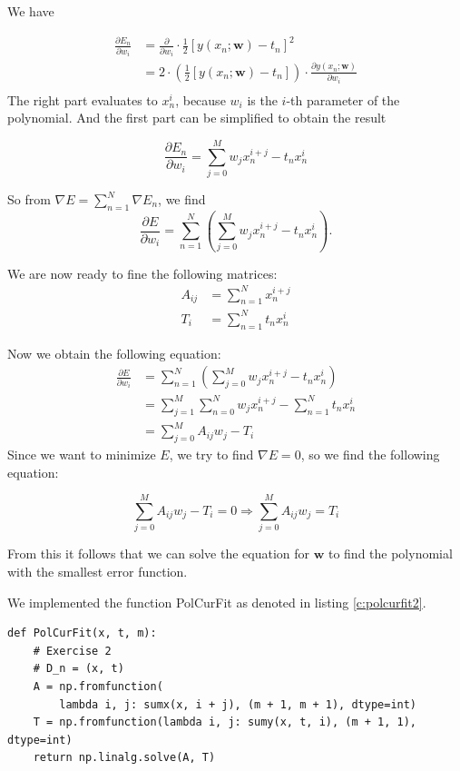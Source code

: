 \documentclass[11pt]{article}
\begin{document}
We have 

\begin{align*}
\frac{\partial E_n}{\partial w_i} &= \frac{\partial }{\partial w_i} \cdot \frac{1}{2} \left[y(x_n;\textbf{w})-t_n\right]^2 \\
&= 2\cdot \left( \frac{1}{2} \left[y(x_n;\textbf{w})-t_n\right] \right) \cdot \frac{\partial  y(x_n;\textbf{w})}{\partial w_i} \\
\end{align*}
The right part evaluates to $x_n^i$, because $w_i$ is the $i$-th parameter of the polynomial. And the first part can be simplified to obtain the result

\[
\frac{\partial E_n}{\partial w_i} = \sum^M_{j=0}w_j x_n^{i+j} - t_n x_n^i
\]

So from $\nabla E = \sum^N_{n=1} \nabla E_n$, we find 
\[
\frac{\partial E}{\partial w_i} =\sum^N_{n=1}\left(\sum^M_{j=0}w_j x_n^{i+j} - t_n x_n^i\right).
\]

We are now ready to fine the following matrices:
\begin{align*}
A_{ij} &= \sum^N_{n=1} x_n^{i+j} \\
T_{i} &= \sum^N_{n=1}t_n x_n^i
\end{align*}

Now we obtain the following equation:
\begin{align*}
\frac{\partial E}{\partial w_i} &=\sum^N_{n=1}\left(\sum^M_{j=0}w_j x_n^{i+j} - t_n x_n^i\right) \\
&= \sum^M_{j=1}\sum^N_{n=0}w_j x_n^{i+j} - \sum^N_{n=1}t_n x_n^i  \tag{by applying simple transformations to the sum} \\
&=\sum^M_{j=0}A_{ij}w_j - T_i
\end{align*}
Since we want to minimize $E$, we try to find $\nabla E = 0$, so we find the following equation:

\begin{equation}
\label{eq:1}
\sum^M_{j=0}A_{ij}w_j-T_i = 0 \Rightarrow \sum^M_{j=0} A_{ij}w_j = T_i
\end{equation}

From this it follows that we can solve the equation for $\textbf{w}$ to find the polynomial with the smallest error function.

 We implemented the function PolCurFit as denoted in listing \ref{c:polcurfit2}.

\begin{lstlisting}[caption={PolCurFit}, label={c:polcurfit}]
def PolCurFit(x, t, m):
    # Exercise 2
    # D_n = (x, t)
    A = np.fromfunction(
        lambda i, j: sumx(x, i + j), (m + 1, m + 1), dtype=int)
    T = np.fromfunction(lambda i, j: sumy(x, t, i), (m + 1, 1), dtype=int)
    return np.linalg.solve(A, T)
\end{lstlisting}
\end{document}
